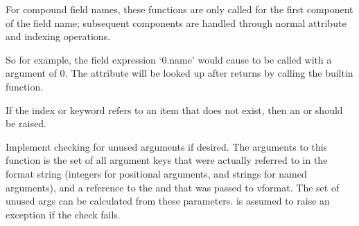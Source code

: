 \documentclass[letterpaper,10pt,english]{sphinxmanual}
\begin{document}
\begin{fulllineitems}
\begin{fulllineitems}
For compound field names, these functions are only called for the first
component of the field name; subsequent components are handled through
normal attribute and indexing operations.

So for example, the field expression ‘0.name’ would cause
{\hyperref[\detokenize{string:string.Formatter.get_value}]{}} to be called with a  argument of 0.  The 
attribute will be looked up after {\hyperref[\detokenize{string:string.Formatter.get_value}]{}} returns by calling the
built\sphinxhyphen{}in  function.

If the index or keyword refers to an item that does not exist, then an
 or  should be raised.

\end{fulllineitems}


\begin{fulllineitems}
\label{\detokenize{string:string.Formatter.check_unused_args}}
Implement checking for unused arguments if desired.  The arguments to this
function is the set of all argument keys that were actually referred to in
the format string (integers for positional arguments, and strings for
named arguments), and a reference to the  and  that was
passed to vformat.  The set of unused args can be calculated from these
parameters.  {\hyperref[\detokenize{string:string.Formatter.check_unused_args}]{}} is assumed to raise an exception if
the check fails.

\end{fulllineitems}



\end{fulllineitems}
\end{document}
